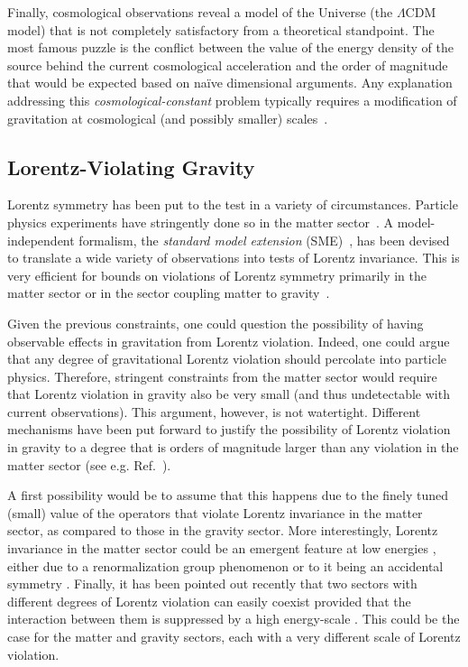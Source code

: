 \documentclass[prd,aps,twocolumn,nofootinbib,showpacs,superscriptaddress]{revtex4-1}
\begin{document}
Finally, cosmological observations
\cite{Ade:2013zuv,Spergel:2006hy} reveal a model of the Universe (the
$\Lambda$CDM model) that is not completely satisfactory from a
theoretical standpoint. The most famous puzzle is the conflict between
the value of the energy density of the source behind the current
cosmological acceleration and the order of magnitude that would be expected
based on na\"ive dimensional arguments. Any
explanation addressing this \textit{cosmological-constant} problem
typically requires a modification of gravitation at cosmological (and possibly smaller)
scales~\cite{DEBook,Clifton:2011jh}. 

\subsection{Lorentz-Violating Gravity}
\label{sec:LVG-intro}

Lorentz symmetry has been put to the test in a variety of circumstances. 
Particle physics experiments have stringently done so in the matter 
sector~\cite{Kostelecky:2003fs,Kostelecky:2008ts,Mattingly:2005re,Jacobson:2005bg}. 
A model-independent formalism, the \textit{standard model 
extension} (SME)~\cite{Colladay:1998fq,Kostelecky:1998id,Kostelecky:1999rh}, 
has been devised to  translate a wide variety of observations into tests of Lorentz invariance. 
This is very efficient for  bounds  on violations of Lorentz
symmetry primarily in the matter sector \cite{Kostelecky:2008ts} or in the sector coupling matter to gravity~\cite{Kostelecky:2010ze}. 

Given the previous constraints, one could question the possibility of having observable effects in gravitation from Lorentz violation. Indeed,
one could argue that any degree of gravitational Lorentz violation should percolate into particle physics. Therefore, stringent constraints from the matter sector 
would 
require that Lorentz violation in gravity also be very small (and thus undetectable with current observations). 
This argument, however, is not watertight. Different mechanisms have been put forward 
to justify the possibility of Lorentz violation in gravity to a degree that is orders of magnitude larger than any violation in the matter sector (see e.g. Ref.~\cite{Liberati:2013xla}).

A first possibility would be to assume that this happens due to the finely tuned (small) value of the operators that violate Lorentz invariance in the matter sector, as compared
to those in the gravity sector. More interestingly, Lorentz invariance in the matter sector could be an emergent feature at low energies \cite{Froggatt:1991ft}, either due to a renormalization group phenomenon \cite{Chadha:1982qq,Bednik:2013nxa} or to it being an accidental symmetry \cite{GrootNibbelink:2004za}. Finally, it has been pointed out recently  that two sectors with different degrees of Lorentz violation can easily coexist provided that the interaction between them is suppressed by a high energy-scale \cite{Pospelov:2010mp}. This could be the case for the matter and  gravity sectors, each with a very different scale of Lorentz violation.
\end{document}
